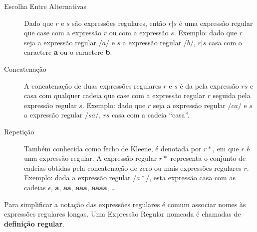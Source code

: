 \begin{description}
	\item[Escolha Entre Alternativas] Dado que $r$ e $s$ são expressões
		regulares, então $r | s$ é uma expressão regular que case com a expressão
		$r$ ou com a expressão $s$. Exemplo: dado que $r$ seja a expressão regular
		$/a/$ e $s$ a expressão regular $/b/$, $r | s$ casa com o caractere
		\textbf{a} ou o caractere \textbf{b}.
	\item[Concatenação] A concatenação de duas expressões regulares $r$ e $s$ é
		da pela expressão $rs$ e casa com qualquer cadeia que case com a expressão
		regular $r$ seguida pela expressão regular $s$. Exemplo: dado que $r$ seja
		a expressão regular $/ca/$ e $s$ a expressão regular $/sa/$, $rs$ casa
		com a cadeia ``casa''.
	\item[Repetição] Também conhecida como fecho de Kleene, é denotada por $r*$,
		em que $r$ é uma expressão regular. A expressão regular $r*$ representa o
		conjunto de cadeias obtidas pela concatenação de zero ou mais expressões
		regulares $r$. Exemplo: dada a expressão regular $/a*/$, esta expressão
		casa com as cadeias \textbf{$\epsilon$}, \textbf{a}, \textbf{aa},
		\textbf{aaa}, \textbf{aaaa}, \dots.
\end{description}

Para simplificar a notação das expressões regulares é comum associar nomes às
expressões regulares longas. Uma Expressão Regular nomeada é chamadas de
\textbf{definição regular}.


